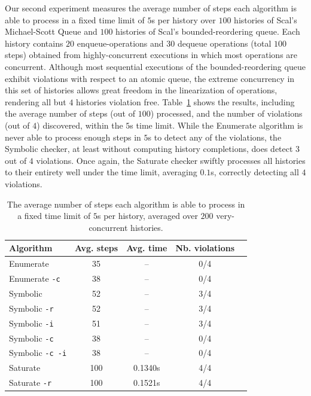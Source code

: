 Our second experiment measures the average number of steps each algorithm is
able to process in a fixed time limit of $5$s per history over $100$ histories
of Scal's Michael-Scott Queue and $100$ histories of Scal's bounded-reordering
queue. Each history contains $20$ {\sf enqueue}-operations and $30$ {\sf
dequeue} operations (total $100$ steps) obtained from highly-concurrent
executions in which most operations are concurrent. Although most sequential
executions of the bounded-reordering queue exhibit violations with respect to
an atomic queue, the extreme concurrency in this set of histories allows great
freedom in the linearization of operations, rendering all but $4$ histories
violation free. Table~\ref{tab:exp:con} shows the results, including the
average number of steps (out of $100$) processed, and the number of violations
(out of $4$) discovered, within the $5$s time limit. While the {\sc Enumerate}
algorithm is never able to process enough steps in $5$s to detect any of the
violations, the {\sc Symbolic} checker, at least without computing history
completions, does detect $3$ out of $4$ violations. Once again, the {\sc
Saturate} checker swiftly processes all histories to their entirety well under
the time limit, averaging $0.1$s, correctly detecting all $4$ violations.

\begin{table}[t]
  \footnotesize
  \centering
  \setlength{\tabcolsep}{1.8mm}
  \begin{tabular}{lcccc}
    Algorithm & Avg. steps & Avg. time & Nb. violations \\
    \hline
    {\sc Enumerate}             & 35  & --      & 0/4 \\
    {\sc Enumerate} {\tt -c}    & 38  & --      & 0/4 \\
    {\sc Symbolic}              & 52  & --      & 3/4 \\
    {\sc Symbolic} {\tt -r}     & 52  & --      & 3/4 \\
    {\sc Symbolic} {\tt -i}     & 51  & --      & 3/4 \\
    {\sc Symbolic} {\tt -c}     & 38  & --      & 0/4 \\
    {\sc Symbolic} {\tt -c -i}  & 38  & --      & 0/4 \\
    {\sc Saturate}              & 100 & 0.1340s & 4/4 \\
    {\sc Saturate} {\tt -r}     & 100 & 0.1521s & 4/4
  \end{tabular} 

  \caption{The average number of steps each algorithm is able to process in a
  fixed time limit of $5$s per history, averaged over $200$ very-concurrent
  histories.}
  \label{tab:exp:con}
\end{table}



